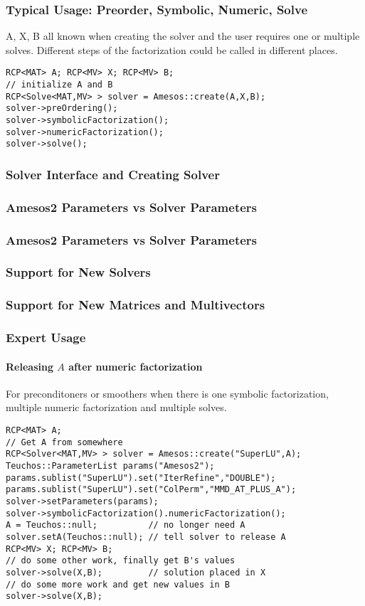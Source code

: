 \documentclass[xcolor=dvipsnames]{beamer}
\begin{document}
\begin{frame}[fragile]
  \frametitle{Typical Usage: Preorder, Symbolic, Numeric, Solve}
  A, X, B all known when creating the solver and the user requires one or
  multiple solves. Different steps of the factorization could be called in
  different places.
  \begin{lstlisting}
RCP<MAT> A; RCP<MV> X; RCP<MV> B;
// initialize A and B
RCP<Solve<MAT,MV> > solver = Amesos::create(A,X,B);
solver->preOrdering();
solver->symbolicFactorization();
solver->numericFactorization();
solver->solve();
  \end{lstlisting}
\end{frame}

\begin{frame}
  \frametitle{Solver Interface and Creating Solver}
\end{frame}

\begin{frame}
  \frametitle{Amesos2 Parameters vs Solver Parameters}
\end{frame}

\begin{frame}
  \frametitle{Amesos2 Parameters vs Solver Parameters}
\end{frame}

\begin{frame}
  \frametitle{Support for New Solvers}
\end{frame}

\begin{frame}
  \frametitle{Support for New Matrices and Multivectors}
\end{frame}

\begin{frame}[fragile]
  \frametitle{Expert Usage}
  \framesubtitle{Releasing $A$ after numeric factorization}
  For preconditoners or smoothers when there is one symbolic factorization,
  multiple numeric factorization and multiple solves.
  \begin{lstlisting}
RCP<MAT> A;
// Get A from somewhere
RCP<Solver<MAT,MV> > solver = Amesos::create("SuperLU",A);
Teuchos::ParameterList params("Amesos2");
params.sublist("SuperLU").set("IterRefine","DOUBLE");
params.sublist("SuperLU").set("ColPerm","MMD_AT_PLUS_A");
solver->setParameters(params);
solver->symbolicFactorization().numericFactorization();
A = Teuchos::null;          // no longer need A
solver.setA(Teuchos::null); // tell solver to release A
RCP<MV> X; RCP<MV> B;
// do some other work, finally get B's values
solver->solve(X,B);         // solution placed in X
// do some more work and get new values in B
solver->solve(X,B);
  \end{lstlisting}
\end{frame}
\end{document}
